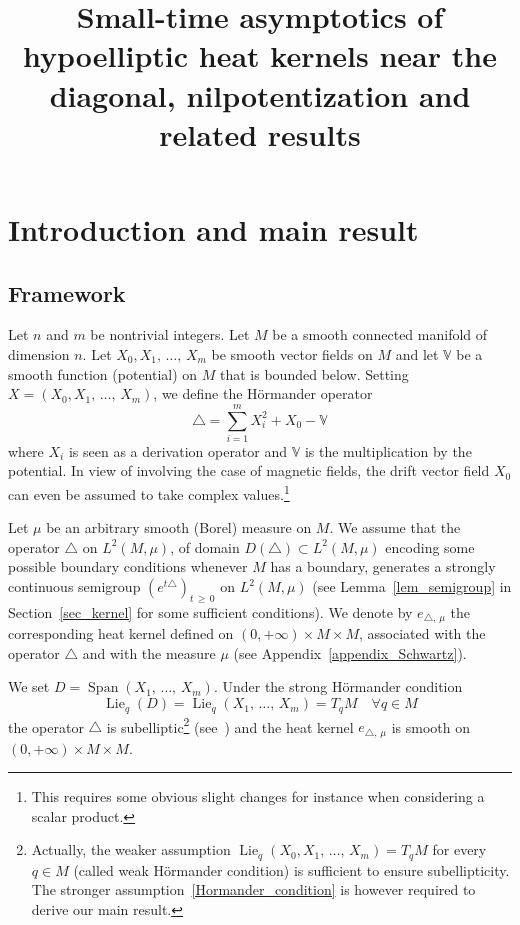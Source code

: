 \documentclass[AHL,Unicode,published]{cedram}
\title[Small-time asymptotics of hypoelliptic heat kernels]{Small-time asymptotics of hypoelliptic heat kernels near the diagonal, nilpotentization and related results}
\author[\initial{Y.} \lastname{Colin de Verdière}]{\firstname{Yves} \lastname{Colin de Verdière}}
\author[\initial{L.} \lastname{Hillairet}]{\firstname{Luc} \lastname{Hillairet}}
\author[\initial{E.} \lastname{Trélat}]{\firstname{Emmanuel} \lastname{Trélat}}
\newcommand{\bbV}{\mathbb{V}}
\DeclareMathOperator{\Span}{Span}
\DeclareMathOperator{\Lie}{Lie}
\renewcommand{\geq}{\geqslant}
\let\oldforall\forall
\renewcommand*{\forall}{\mathrel{\oldforall}}
\begin{document}
\maketitle

\tableofcontents
\newpage



\section{Introduction and main result}
\subsection{Framework}\label{sec_intro}
Let $n$ and $m$ be nontrivial integers. Let $M$ be a smooth connected manifold of dimension $n$. Let $X_0,X_1,\,\ldots,\,X_m$ be smooth vector fields on $M$ and let $\bbV$ be a smooth function (potential) on $M$ that is bounded below. Setting $X=(X_0,X_1,\,\ldots,\,X_m)$, we define the H\"ormander operator
\begin{equation}\label{def_DeltaX}
\triangle = \sum_{i=1}^m X_i^2 + X_0 - \bbV
\end{equation}
where $X_i$ is seen as a derivation operator and $\bbV$ is the multiplication by the potential. In view of involving the case of magnetic fields, the drift vector field $X_0$ can even be assumed to take complex values.\footnote{This requires some obvious slight changes for instance when considering a scalar product.}

Let $\mu$ be an arbitrary smooth (Borel) measure on $M$. We assume that the operator $\triangle$ on $L^2(M,\mu)$, of domain $D(\triangle)\subset L^2(M,\mu)$ encoding some possible boundary conditions whenever $M$ has a boundary, generates a strongly continuous semigroup $(e^{t\triangle})_{t\,\geq\,0}$ on $L^2(M,\mu)$ (see Lemma~\ref{lem_semigroup} in Section~\ref{sec_kernel} for some sufficient conditions). We denote by $e_{\triangle,\,\mu}$ the corresponding heat kernel defined on $(0,+\infty)\times M\times M$, associated with the operator $\triangle$ and with the measure $\mu$ (see Appendix~\ref{appendix_Schwartz}).

We set $D=\Span(X_1,\,\ldots,\,X_m)$. Under the strong H\"ormander condition
\begin{equation}\label{Hormander_condition}
\Lie_q(D)=\Lie_q(X_1,\,\ldots,\,X_m)=T_qM\quad\forall q\in M
\end{equation}
the operator $\triangle$ is subelliptic\footnote{Actually, the weaker assumption $\Lie_q(X_0,X_1,\,\ldots,\,X_m)=T_qM$ for every $q\in M$ (called weak H\"ormander condition) is sufficient to ensure subellipticity. The stronger assumption~\eqref{Hormander_condition} is however required to derive our main result.} (see~\cite{Ho-67}) and the heat kernel $e_{\triangle,\,\mu}$ is smooth on $(0,+\infty)\times M\times M$.
\end{document}
